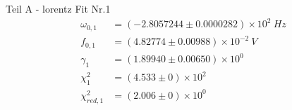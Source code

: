 {\LARGE Teil A - lorentz Fit Nr.1}
\begin{align*}
	\omega_{0,1} &= \left(-2.8057244 \pm 0.0000282\right) \times 10^{2}\ Hz\\
	f_{0,1} &= \left(4.82774 \pm 0.00988\right) \times 10^{-2}\ V\\
	\gamma_1 &= \left(1.89940 \pm 0.00650\right) \times 10^{0}\ \\
	\chi^2_{1} &= \left(4.533 \pm 0\right) \times 10^{2}\ \\
	\chi^2_{red,1} &= \left(2.006 \pm 0\right) \times 10^{0}\ \\
\end{align*}